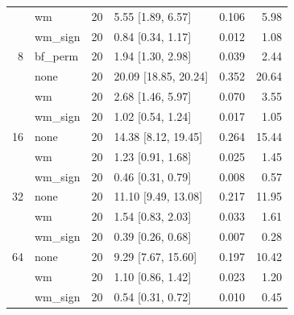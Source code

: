 \documentclass[11pt]{article}
\newcommand{\md}[1]{\textsf{#1}}
\begin{document}
\begin{table}[H]
\begin{tabular}{@{}rlrlrr@{}}
 & \md{wm} & 20 & 5.55 [1.89, 6.57] & 0.106 & 5.98 \\
 & \md{wm\_sign} & 20 & 0.84 [0.34, 1.17] & 0.012 & 1.08 \\
\midrule
8 & \md{bf\_perm} & 20 & 1.94 [1.30, 2.98] & 0.039 & 2.44 \\
 & \md{none} & 20 & 20.09 [18.85, 20.24] & 0.352 & 20.64 \\
 & \md{wm} & 20 & 2.68 [1.46, 5.97] & 0.070 & 3.55 \\
 & \md{wm\_sign} & 20 & 1.02 [0.54, 1.24] & 0.017 & 1.05 \\
\midrule
16 & \md{none} & 20 & 14.38 [8.12, 19.45] & 0.264 & 15.44 \\
 & \md{wm} & 20 & 1.23 [0.91, 1.68] & 0.025 & 1.45 \\
 & \md{wm\_sign} & 20 & 0.46 [0.31, 0.79] & 0.008 & 0.57 \\
\midrule
32 & \md{none} & 20 & 11.10 [9.49, 13.08] & 0.217 & 11.95 \\
 & \md{wm} & 20 & 1.54 [0.83, 2.03] & 0.033 & 1.61 \\
 & \md{wm\_sign} & 20 & 0.39 [0.26, 0.68] & 0.007 & 0.28 \\
\midrule
64 & \md{none} & 20 & 9.29 [7.67, 15.60] & 0.197 & 10.42 \\
 & \md{wm} & 20 & 1.10 [0.86, 1.42] & 0.023 & 1.20 \\
 & \md{wm\_sign} & 20 & 0.54 [0.31, 0.72] & 0.010 & 0.45 \\
\bottomrule
\end{tabular}
\end{table}
\end{document}
